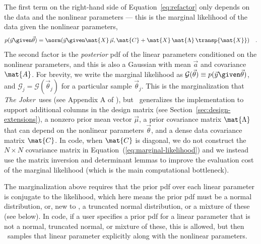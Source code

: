 \documentclass[twocolumn]{AASTeX7/aastex701}
\newcommand{\harv}{\package{harv}}
\newcommand{\joker}{\textsl{The Joker}}
\begin{document}
The first term on the right-hand side of Equation~\ref{eq:refactor} only depends on the
data and the nonlinear parameters --- this is the marginal likelihood of the data given
the nonlinear parameters,
\begin{equation}
  p(\vec{y} \given \vec{\theta})
    = \norm(\vec{y} \given \mat{X}\,\vec{\mu},
      \mat{C} + \mat{X}\,\mat{\Lambda}\,\transp{\mat{X}})
  \quad .
  \label{eq:marginal-likelihood}
\end{equation}
The second factor is the \textit{posterior} pdf of the linear parameters conditioned on
the nonlinear parameters, and this is also a Gaussian with mean $\vec{a}$ and covariance
$\mat{A}$.
For brevity, we write the marginal likelihood as $\mathcal{G}(\vec{\theta}) \equiv
p(\vec{y} \given \vec{\theta})$, and $\mathcal{G}_j = \mathcal{G}(\vec{\theta}_j)$ for a
particular sample $\vec{\theta}_j$.
This is the marginalization that \joker\ uses (see Appendix A of
\citealt{Price-Whelan:2020}), but \harv\ generalizes the implementation to support
additional columns in the design matrix (see Section~\ref{sec:design-extensions}), a
nonzero prior mean vector $\vec{\mu}$, a prior covariance matrix $\mat{\Lambda}$ that
can depend on the nonlinear parameters $\vec{\theta}$, and a dense data covariance
matrix $\mat{C}$.
In code, when $\mat{C}$ is diagonal, we do not construct the $N \times N$ covariance
matrix in Equation~(\ref{eq:marginal-likelihood}) and we instead use the matrix
inversion and determinant lemmas to improve the evaluation cost of the marginal
likelihood (which is the main computational bottleneck).

The marginalization above requires that the prior pdf over each linear parameter is
conjugate to the likelihood, which here means the prior pdf must be a normal
distribution, or, new to \harv, a truncated normal distribution, or a mixture of these
(see below).
In code, if a user specifies a prior pdf for a linear parameter that is not a normal,
truncated normal, or mixture of these, this is allowed, but then \harv\ samples that
linear parameter explicitly along with the nonlinear parameters.
\end{document}
